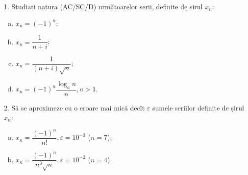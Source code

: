 1. Studiați natura (AC/SC/D) următoarelor serii, definite de șirul $ x_n $:
\begin{enumerate}[(a)]
\item $ x_n = (-1)^n $;
\item $ x_n = \dfrac{1}{n + i} $;
\item $ x_n = \dfrac{1}{(n + i)\sqrt{n}} $;
\item $ x_n = (-1)^n \dfrac{\log_a n}{n}, a > 1 $.
\end{enumerate}

\vspace{1cm}

2. Să se aproximeze cu o eroare mai mică decît $ \varepsilon $ sumele seriilor
definite de șirul $ x_n $:
\begin{enumerate}[(a)]
\item $ x_n = \dfrac{(-1)^n}{n!}, \varepsilon = 10^{-3} $ ($ n = 7 $);
\item $ x_n = \dfrac{(-1)^n}{n^3 \sqrt{n}}, \varepsilon  = 10^{-2} $ ($ n = 4 $).
\end{enumerate}


